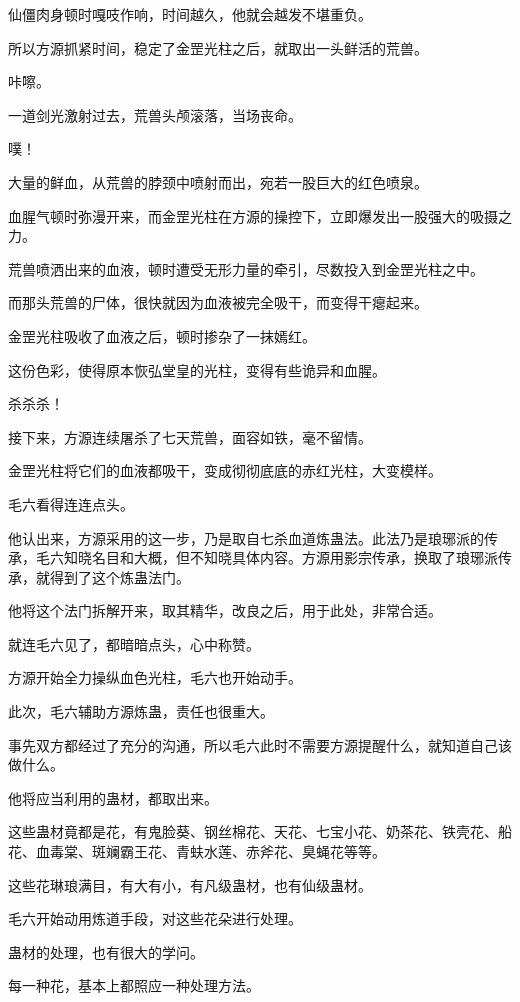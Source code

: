 \begin{this_body}
仙僵肉身顿时嘎吱作响，时间越久，他就会越发不堪重负。

所以方源抓紧时间，稳定了金罡光柱之后，就取出一头鲜活的荒兽。

咔嚓。

一道剑光激射过去，荒兽头颅滚落，当场丧命。

噗！

大量的鲜血，从荒兽的脖颈中喷射而出，宛若一股巨大的红色喷泉。

血腥气顿时弥漫开来，而金罡光柱在方源的操控下，立即爆发出一股强大的吸摄之力。

荒兽喷洒出来的血液，顿时遭受无形力量的牵引，尽数投入到金罡光柱之中。

而那头荒兽的尸体，很快就因为血液被完全吸干，而变得干瘪起来。

金罡光柱吸收了血液之后，顿时掺杂了一抹嫣红。

这份色彩，使得原本恢弘堂皇的光柱，变得有些诡异和血腥。

杀杀杀！

接下来，方源连续屠杀了七天荒兽，面容如铁，毫不留情。

金罡光柱将它们的血液都吸干，变成彻彻底底的赤红光柱，大变模样。

毛六看得连连点头。

他认出来，方源采用的这一步，乃是取自七杀血道炼蛊法。此法乃是琅琊派的传承，毛六知晓名目和大概，但不知晓具体内容。方源用影宗传承，换取了琅琊派传承，就得到了这个炼蛊法门。

他将这个法门拆解开来，取其精华，改良之后，用于此处，非常合适。

就连毛六见了，都暗暗点头，心中称赞。

方源开始全力操纵血色光柱，毛六也开始动手。

此次，毛六辅助方源炼蛊，责任也很重大。

事先双方都经过了充分的沟通，所以毛六此时不需要方源提醒什么，就知道自己该做什么。

他将应当利用的蛊材，都取出来。

这些蛊材竟都是花，有鬼脸葵、钢丝棉花、天花、七宝小花、奶茶花、铁壳花、船花、血毒棠、斑斓霸王花、青蚨水莲、赤斧花、臭蝇花等等。

这些花琳琅满目，有大有小，有凡级蛊材，也有仙级蛊材。

毛六开始动用炼道手段，对这些花朵进行处理。

蛊材的处理，也有很大的学问。

每一种花，基本上都照应一种处理方法。


\end{this_body}
